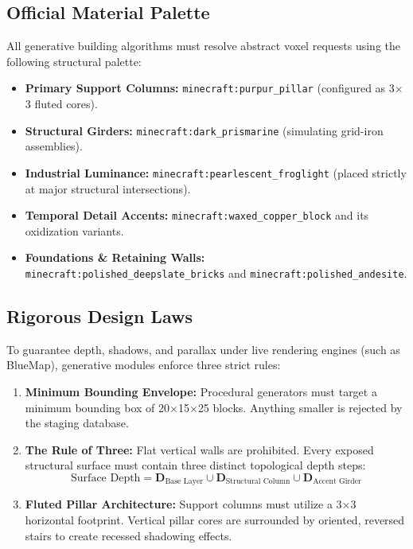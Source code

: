 \subsection{Official Material Palette}
All generative building algorithms must resolve abstract voxel requests using the following structural palette:
\begin{itemize}
    \item \textbf{Primary Support Columns:} \texttt{minecraft:purpur\_pillar} (configured as 3$\times$3 fluted cores).
    \item \textbf{Structural Girders:} \texttt{minecraft:dark\_prismarine} (simulating grid-iron assemblies).
    \item \textbf{Industrial Luminance:} \texttt{minecraft:pearlescent\_froglight} (placed strictly at major structural intersections).
    \item \textbf{Temporal Detail Accents:} \texttt{minecraft:waxed\_copper\_block} and its oxidization variants.
    \item \textbf{Foundations \& Retaining Walls:} \texttt{minecraft:polished\_deepslate\_bricks} and \texttt{minecraft:polished\_andesite}.
\end{itemize}

\subsection{Rigorous Design Laws}
To guarantee depth, shadows, and parallax under live rendering engines (such as BlueMap), generative modules enforce three strict rules:
\begin{enumerate}
    \item \textbf{Minimum Bounding Envelope:} Procedural generators must target a minimum bounding box of 20$\times$15$\times$25 blocks. Anything smaller is rejected by the staging database.
    \item \textbf{The Rule of Three:} Flat vertical walls are prohibited. Every exposed structural surface must contain three distinct topological depth steps:
    \begin{equation}
        \text{Surface Depth} = \mathbf{D}_{\text{Base Layer}} \cup \mathbf{D}_{\text{Structural Column}} \cup \mathbf{D}_{\text{Accent Girder}}
    \end{equation}
    \item \textbf{Fluted Pillar Architecture:} Support columns must utilize a 3$\times$3 horizontal footprint. Vertical pillar cores are surrounded by oriented, reversed stairs to create recessed shadowing effects.
\end{enumerate}

